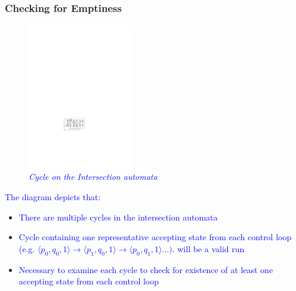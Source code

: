 \begin{frame}
\frametitle{Checking for Emptiness}

\begin{figure}
\begin{center}
\includegraphics[width=45mm]{state_copy_transition_cycle.pdf}
\end{center}
\caption{{\em \tiny{\textcolor{blue}{Cycle on the Intersection automata}}}}
\label{transition}
\end{figure}

\tiny{\textcolor{blue}{ The diagram depicts that:}}

\begin{itemize}
 \item \tiny{\textcolor{blue}{ There are multiple cycles in the intersection automata}}
 \item \tiny{\textcolor{blue}{ Cycle containing one representative accepting state from each control loop (e.g.
                      $\langle p_0, q_0, 1 \rangle \rightarrow \langle p_1, q_0, 1 \rangle \rightarrow \langle p_0, q_1, 1\rangle \dots)$. will be a valid run}} 
\item  \tiny{\textcolor{blue}{Necessary to examine each cycle to check for existence of at least one accepting state from each control
       loop}}
\end{itemize}  




\end{frame}
